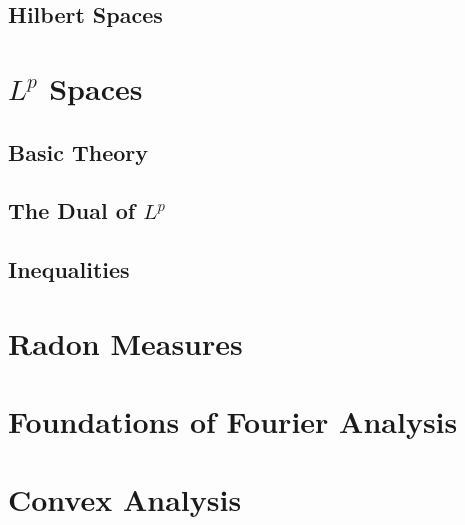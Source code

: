 \documentclass{article}
\theoremstyle{definition}
\begin{document}
\subsection{Hilbert Spaces}
\section{$ L^p $ Spaces}
\subsection{Basic Theory}
\subsection{The Dual of $ L^p $}
\subsection{Inequalities}
\section{Radon Measures}
\section{Foundations of Fourier Analysis}
\section{Convex Analysis}
\newpage
{} 
\end{document}
